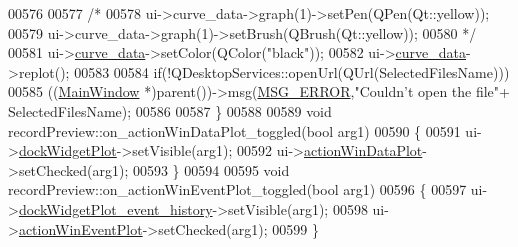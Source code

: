 \begin{DoxyCode}
00576 
00577      \textcolor{comment}{/*}
00578 \textcolor{comment}{     ui->curve\_data->graph(1)->setPen(QPen(Qt::yellow));}
00579 \textcolor{comment}{     ui->curve\_data->graph(1)->setBrush(QBrush(Qt::yellow));}
00580 \textcolor{comment}{     */}
00581      ui->\hyperlink{a00028_a247d94481323c0bc4f8b6458a8a535dd}{curve\_data}->setColor(QColor(\textcolor{stringliteral}{"black"}));
00582      ui->\hyperlink{a00028_a247d94481323c0bc4f8b6458a8a535dd}{curve\_data}->replot();
00583 
00584        \textcolor{keywordflow}{if}(!QDesktopServices::openUrl(QUrl(SelectedFilesName)))
00585            ((\hyperlink{a00006}{MainWindow} *)parent())->msg(\hyperlink{a00034_aa8a990825a5a62c89d2fb8b08d8a1070}{MSG\_ERROR},\textcolor{stringliteral}{"Couldn't open the file"}+
      SelectedFilesName);
00586 
00587 \}
00588 
00589 \textcolor{keywordtype}{void} recordPreview::on\_actionWinDataPlot\_toggled(\textcolor{keywordtype}{bool} arg1)
00590 \{
00591     ui->\hyperlink{a00028_a07b76f17803ec09e0367b72938bbd097}{dockWidgetPlot}->setVisible(arg1);
00592     ui->\hyperlink{a00028_aa09067a9c96c9cd78f75261a9fcb89f0}{actionWinDataPlot}->setChecked(arg1);
00593 \}
00594 
00595 \textcolor{keywordtype}{void} recordPreview::on\_actionWinEventPlot\_toggled(\textcolor{keywordtype}{bool} arg1)
00596 \{
00597     ui->\hyperlink{a00028_a2a8f7ee8d4458dd20481c8a1c29ce185}{dockWidgetPlot\_event\_history}->setVisible(arg1);
00598     ui->\hyperlink{a00028_ac72ec9c8679d46fd43a87f99ee6db893}{actionWinEventPlot}->setChecked(arg1);
00599 \}
\end{DoxyCode}
